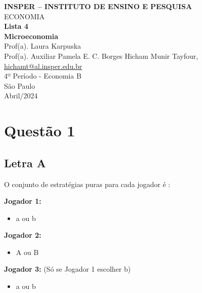 \documentclass[a4paper,12pt]{article}[abntex2]
\begin{document}
\begin{titlepage}
    \centering
    \vspace*{1cm}
    \Large\textbf{INSPER – INSTITUTO DE ENSINO E PESQUISA}\\
    \Large ECONOMIA\\
    \vspace{1.5cm}
    \Large\textbf{Lista 4}\\
    \textbf{Microeconomia}\\
    \vspace{1.5cm}
    Prof(a). Laura Karpuska \\
    Prof(a). Auxiliar  Pamela E. C. Borges
    \vfill
    \normalsize
    Hicham Munir Tayfour, \href{mailto:hichamt@al.insper.edu.br}{hichamt@al.insper.edu.br}\\
    4º Período - Economia B\\
    \vfill
    São Paulo\\
    Abril/2024
\end{titlepage}

\newpage

\newpage
\tableofcontents
\thispagestyle{empty} %
\newpage
\setcounter{page}{1} %
\justify
\onehalfspacing

\pagestyle{fancy}
\fancyhf{}
\rhead{\thepage}



\section{\textbf{Questão 1}}
\subsection{\textbf{Letra A}}

O conjunto de estratégias puras para cada jogador é :

\textbf{Jogador 1:}
\begin{itemize}
    \item a ou b
\end{itemize}

\textbf{Jogador 2:}
\begin{itemize}
    \item A ou B
\end{itemize}

\textbf{Jogador 3:} (Só se Jogador 1 escolher b)
\begin{itemize}
    \item a ou b
\end{itemize}
\end{document}

